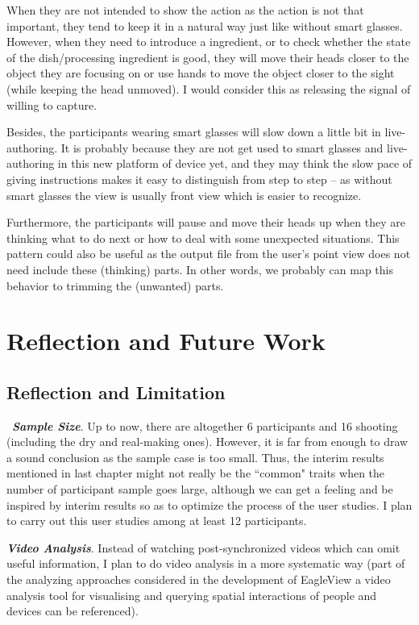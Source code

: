 \documentclass[fyp]{socreport}
\begin{document}
When they are not intended to show the action as the action is not that important, they tend to keep it in a natural way just like without smart glasses. However, when they need to introduce a ingredient, or to check whether the state of the dish/processing ingredient is good, they will move their heads closer to the object they are focusing on or use hands to move the object closer to the sight (while keeping the head unmoved). I would consider this as releasing the signal of willing to capture.

Besides, the participants wearing smart glasses will slow down a little bit in live-authoring. It is probably because they are not get used to smart glasses and live-authoring in this new platform of device yet, and they may think the slow pace of giving instructions makes it easy to distinguish from step to step -- as without smart glasses the view is usually front view which is easier to recognize.

Furthermore, the participants will pause and move their heads up when they are thinking what to do next or how to deal with some unexpected situations. This pattern could also be useful as the output file from the user's point view does not need include these (thinking) parts. In other words, we probably can map this behavior to trimming the (unwanted) parts.

\chapter{Reflection and Future Work}
\section{Reflection and Limitation}
\quad\, \textit{\textbf{Sample Size}}. Up to now, there are altogether 6 participants and 16 shooting (including the dry and real-making ones). However, it is far from enough to draw a sound conclusion as the sample case is too small. Thus, the interim results mentioned in last chapter might not really be the ``common" traits when the number of participant sample goes large, although we can get a feeling and be inspired by interim results so as to optimize the process of the user studies. I plan to carry out this user studies among at least 12 participants.

\textit{\textbf{Video Analysis}}. Instead of watching post-synchronized videos which can omit useful information, I plan to do video analysis in a more systematic way (part of the analyzing approaches considered in the development of EagleView \cite{brudy2018eagleview} a video analysis tool for visualising and querying spatial interactions of people and devices can be referenced).
\end{document}
